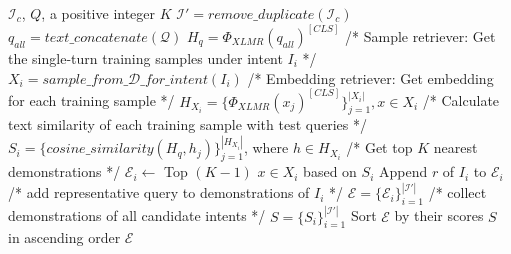 

\begin{algorithm}[t]
\caption{ICL Demonstrations Retrieval}\label{alg:retrieval}
\begin{algorithmic}
\let\oldReturn\Return
\renewcommand{\Return}{\State\oldReturn}
\Require $\mathcal{I}_c$, $Q$, a positive integer $K$
\State $ \mathcal{I}' = remove\_duplicate(\mathcal{I}_c) $
\State $ q_{all} = text\_concatenate(\mathcal{Q}) $
\State $ H_q = \Phi_{XLMR}(q_{all})^{[CLS]} $
\State
{}
  \State /* Sample retriever: Get the single-turn training samples under intent $I_i$ */
  \State $ X_i = sample\_from\_\mathcal{D}\_for\_intent(I_i) $
  \State
  \State /* Embedding retriever: Get embedding for each training sample */
  \State $ H_{X_i} = \{\Phi_{XLMR}(x_j)^{[CLS]}\}_{j=1}^{|X_i|}, x \in X_i $
  \State
  \State /* Calculate text similarity of each training sample with test queries */
  \State $ S_i = \{cosine\_similarity(H_q, h_j)\}_{j=1}^{|H_{X_i}|}$, where $h \in H_{X_i} $
  \State
  \State /* Get top $K$ nearest demonstrations */
  \State $ \mathcal{E}_i \gets $ Top $ (K-1) $ $ x \in X_i$ based on $S_i$
  \State Append $r$ of $I_i$ to $\mathcal{E}_i$ /* add representative query to demonstrations of $I_i$ */
\EndFor
\State
\State $ \mathcal{E} = \{\mathcal{E}_i\}_{i=1}^{|\mathcal{I}'|} $ /* collect demonstrations of all candidate intents */
\State $ S = \{S_i\}_{i=1}^{|\mathcal{I}'|} $
\State Sort $ \mathcal{E} $ by their scores $S$ in ascending order
\State
\Return $ \mathcal{E} $
\end{algorithmic}
\end{algorithm}